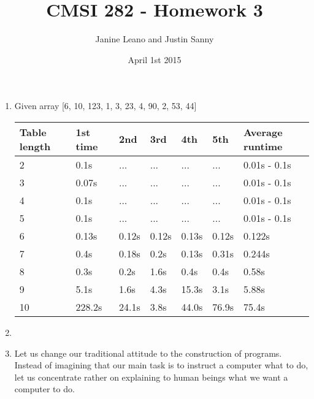\documentclass{article}
\title{CMSI 282 - Homework 3}
\author{Janine Leano and Justin Sanny}
\date{April 1st 2015}
\begin{document}
\maketitle

\begin{enumerate}
	\item 
		
		Given array [6, 10, 123, 1, 3, 23, 4, 90, 2, 53, 44]
		\begin{table}[h]
			\begin{tabular}{|l|l|l|l|l|l|l|}
				\hline
					\textbf{Table length} & \textbf{1st time} & \textbf{2nd} & \textbf{3rd} & \textbf{4th} & \textbf{5th} & \textbf{Average runtime} \\ \hline
				2                     & 0.1s              & ...          & ...          & ...          & ...          & 0.01s - 0.1s             \\ \hline
				3                     & 0.07s             & ...          & ...          & ...          & ...          & 0.01s - 0.1s             \\ \hline
				4                     & 0.1s              & ...          & ...          & ...          & ...          & 0.01s - 0.1s             \\ \hline
				5                     & 0.1s              & ...          & ...          & ...          & ...          & 0.01s - 0.1s             \\ \hline
				6                     & 0.13s             & 0.12s        & 0.12s        & 0.13s        & 0.12s        & 0.122s                   \\ \hline
				7                     & 0.4s              & 0.18s        & 0.2s         & 0.13s        & 0.31s        & 0.244s                   \\ \hline
				8                     & 0.3s              & 0.2s         & 1.6s         & 0.4s         & 0.4s         & 0.58s                    \\ \hline
				9                     & 5.1s              & 1.6s         & 4.3s         & 15.3s        & 3.1s         & 5.88s                    \\ \hline
				10                    & 228.2s            & 24.1s        & 3.8s         & 44.0s        & 76.9s        & 75.4s                    \\ \hline
			\end{tabular}
		\end{table}
		
		
	\item
		
	\item
		Let us change our traditional attitude to the construction of programs. Instead of imagining that our main task is to
		instruct a computer what to do, let us concentrate rather on explaining to human beings what we want a computer to do.
				 

\end{enumerate}
\end{document}
